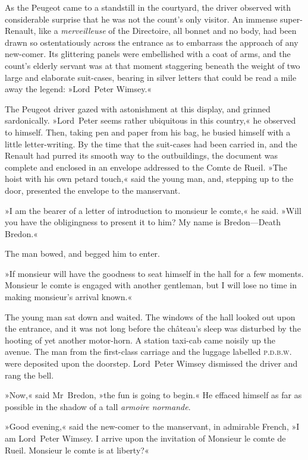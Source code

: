As the Peugeot came to a standstill in the courtyard, the driver observed with considerable surprise that he was not the count's only visitor. An immense super-Renault, like a \textit{merveilleuse} of the Directoire, all bonnet and no body, had been drawn so ostentatiously across the entrance as to embarrass the approach of any new-comer. Its glittering panels were embellished with a coat of arms, and the count's elderly servant was at that moment staggering beneath the weight of two large and elaborate suit-cases, bearing in silver letters that could be read a mile away the legend: »Lord~Peter Wimsey.«

The Peugeot driver gazed with astonishment at this display, and grinned sardonically. »Lord~Peter seems rather ubiquitous in this country,« he observed to himself. Then, taking pen and paper from his bag, he busied himself with a little letter-writing. By the time that the suit-cases had been carried in, and the Renault had purred its smooth way to the outbuildings, the document was complete and enclosed in an envelope addressed to the Comte de Rueil. »The hoist with his own petard touch,« said the young man, and, stepping up to the door, presented the envelope to the manservant.

»I am the bearer of a letter of introduction to monsieur le comte,« he said. »Will you have the obligingness to present it to him? My name is Bredon—Death Bredon.«

The man bowed, and begged him to enter.

»If monsieur will have the goodness to seat himself in the hall for a few moments. Monsieur le comte is engaged with another gentleman, but I will lose no time in making monsieur's arrival known.«

The young man sat down and waited. The windows of the hall looked out upon the entrance, and it was not long before the château's sleep was disturbed by the hooting of yet another motor-horn. A station taxi-cab came noisily up the avenue. The man from the first-class carriage and the luggage labelled \textsc{p.d.b.w.} were deposited upon the doorstep. Lord~Peter Wimsey dismissed the driver and rang the bell.

»Now,« said Mr~Bredon, »the fun is going to begin.« He effaced himself as far as possible in the shadow of a tall \textit{armoire normande}.

»Good evening,« said the new-comer to the manservant, in admirable French, »I am Lord~Peter Wimsey. I arrive upon the invitation of Monsieur le comte de Rueil. Monsieur le comte is at liberty?«

